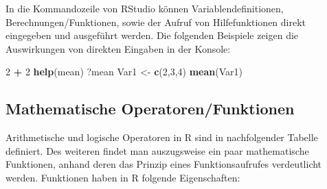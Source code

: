 \documentclass[]{article}
\newenvironment{Shaded}{\begin{snugshade}}{\end{snugshade}}
\newcommand{\KeywordTok}[1]{\textcolor[rgb]{0.13,0.29,0.53}{\textbf{#1}}}
\newcommand{\DecValTok}[1]{\textcolor[rgb]{0.00,0.00,0.81}{#1}}
\newcommand{\StringTok}[1]{\textcolor[rgb]{0.31,0.60,0.02}{#1}}
\newcommand{\OperatorTok}[1]{\textcolor[rgb]{0.81,0.36,0.00}{\textbf{#1}}}
\newcommand{\NormalTok}[1]{#1}
\begin{document}
In die Kommandozeile von RStudio können Variablendefinitionen,
Berechnungen/Funktionen, sowie der Aufruf von Hilfefunktionen direkt
eingegeben und ausgeführt werden. Die folgenden Beispiele zeigen die
Auswirkungen von direkten Eingaben in der Konsole:

\begin{Shaded}
\begin{Highlighting}[]
\DecValTok{2} \OperatorTok{+}\StringTok{ }\DecValTok{2}
\KeywordTok{help}\NormalTok{(mean)}
\NormalTok{?mean}
\NormalTok{Var1 <-}\StringTok{ }\KeywordTok{c}\NormalTok{(}\DecValTok{2}\NormalTok{,}\DecValTok{3}\NormalTok{,}\DecValTok{4}\NormalTok{)}
\KeywordTok{mean}\NormalTok{(Var1)}
\end{Highlighting}
\end{Shaded}

\subsection*{Mathematische
Operatoren/Funktionen}\label{mathematische-operatorenfunktionen}

Arithmetische und logische Operatoren in R sind in nachfolgender Tabelle
definiert. Des weiteren findet man auszugsweise ein paar mathematische
Funktionen, anhand deren das Prinzip eines Funktionsaufrufes
verdeutlicht werden. Funktionen haben in R folgende Eigenschaften:
\end{document}
